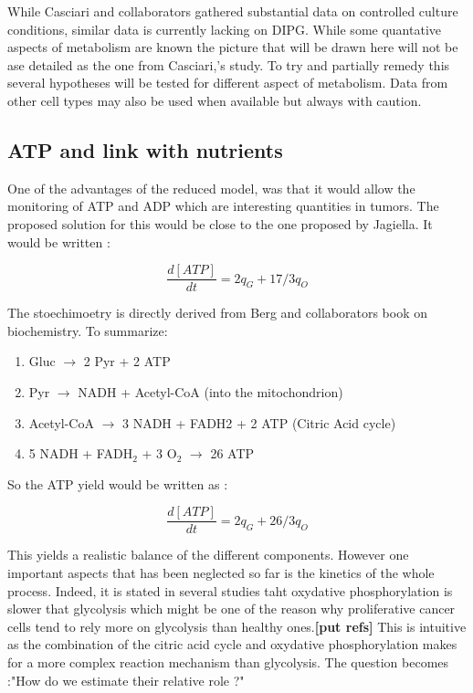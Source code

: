 \documentclass[11pt,a4paper]{article}
\begin{document}
While Casciari and collaborators gathered substantial data on controlled culture conditions, similar data is currently lacking on DIPG. While some quantative aspects of metabolism are known the picture that will be drawn here will not be ase detailed as the one from Casciari,'s study. To try and partially remedy this several hypotheses will be tested for different aspect of metabolism. Data from other cell types may also be used when available but always with caution.

\subsection{ATP and link with nutrients}
One of the advantages of the reduced model, was that it would allow the monitoring of ATP and ADP which are interesting quantities in tumors. The proposed solution for this would be close to the one proposed by Jagiella. It would be written : 

\[ \frac{d[ATP]}{dt} = 2q_G + 17/3q_O \] 

The stoechimoetry is directly derived from Berg and collaborators book on biochemistry.\cite{Berg2006} To summarize:
\begin{enumerate}
\item Gluc $\rightarrow$ 2 Pyr + 2 ATP 
\item Pyr $\rightarrow$ NADH + Acetyl-CoA (into the mitochondrion) 
\item Acetyl-CoA $\rightarrow$ 3 NADH + FADH2 + 2 ATP (Citric Acid cycle)
\item 5 NADH + FADH$_2$ + 3 O$_2$ $\rightarrow$  26 ATP 
\end{enumerate} 

So the ATP yield would be written as :

\[ \frac{d[ATP]}{dt} = 2q_G + 26/3q_O  \] 

This yields a realistic balance of the different components. However one important aspects that has been neglected so far is the kinetics of the whole process. Indeed, it is stated in several studies taht oxydative phosphorylation is slower that glycolysis which might be one of the reason why proliferative cancer cells tend to rely more on glycolysis than healthy ones.\textbf{[put refs]} This is intuitive as the combination of the citric acid cycle and oxydative phosphorylation makes for a more complex reaction mechanism than glycolysis. The question becomes :"How do we estimate their relative role ?"
\end{document}
